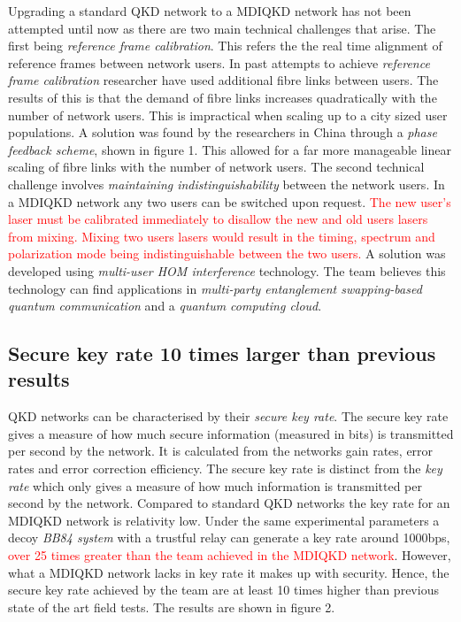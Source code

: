 \documentclass[journal]{vgtc}
\begin{document}
Upgrading a standard QKD network to a MDIQKD network has not been attempted until now as there are two main technical challenges that arise. The first being \textit{reference frame calibration}. This refers the the real time alignment of reference frames between network users. In past attempts to achieve \textit{reference frame calibration} researcher have used additional fibre links between users. The results of this is that the demand of fibre links increases quadratically with the number of network users. This is impractical when scaling up to a city sized user populations. A solution was found by the researchers in China through a \textit{phase feedback scheme}, shown in figure 1. This allowed for a far more manageable linear scaling of fibre links with the number of network users. The second technical challenge involves \textit{maintaining indistinguishability} between the network users. In a MDIQKD network any two users can be switched upon request. \textcolor{red}{ The new user's laser must be calibrated immediately to disallow the new and old users lasers from mixing. Mixing two users lasers would result in the timing, spectrum and polarization mode being indistinguishable between the two users.} A solution was developed using \textit{multi-user HOM interference} technology. The team believes this technology can find applications in \textit{multi-party entanglement swapping-based quantum communication} and a \textit{quantum computing cloud}.


\subsection*{Secure key rate 10 times larger than previous results}

QKD networks can be characterised by their \textit{secure key rate}.  The secure key rate gives a measure of how much secure information (measured in bits) is transmitted per second by the network. It is calculated from the networks gain rates, error rates and error correction efficiency. The secure key rate is distinct from the \textit{key rate} which only gives a measure of how much information is transmitted per second by the network. Compared to standard QKD networks the key rate for an MDIQKD network is relativity low. Under the same experimental parameters a decoy \textit{BB84 system} with a trustful relay can generate a key rate around 1000bps, \textcolor{red}{over 25 times greater than the team achieved in the MDIQKD network}. However, what a MDIQKD network lacks in key rate it makes up with security. Hence, the secure key rate achieved by the team are at least 10 times higher than previous state of the art field tests. The results are shown in figure 2.
\end{document}
